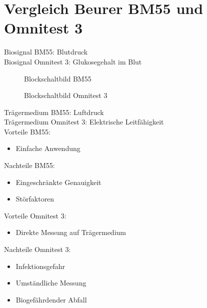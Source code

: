 \section{Vergleich Beurer BM55 und Omnitest 3}
Biosignal BM55: Blutdruck \\
Biosignal Omnitest 3: Glukosegehalt im Blut \\
\begin{figure}[h!]
    \caption{Blockschaltbild BM55}
\end{figure}
\begin{figure}[h!]
    \caption{Blockschaltbild Omnitest 3}
\end{figure}
Trägermedium BM55: Luftdruck \\
Trägermedium Omnitest 3: Elektrische Leitfähigkeit \\
Vorteile BM55: 
\begin{itemize}
    \item Einfache Anwendung
\end{itemize}
Nachteile BM55: 
\begin{itemize}
    \item Eingeschränkte Genauigkeit
    \item Störfaktoren
\end{itemize}
Vorteile Omnitest 3: 
\begin{itemize}
    \item Direkte Messung auf Trägermedium
\end{itemize}
Nachteile Omnitest 3: 
\begin{itemize}
    \item Infektionsgefahr
    \item Umständliche Messung
    \item Biogefährdender Abfall
\end{itemize}
